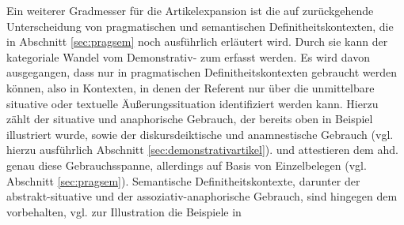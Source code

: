 Ein weiterer Gradmesser für die Artikelexpansion  ist die auf \textcite{Lobner1985,Lobner1998} zurückgehende Unterscheidung   von pragmatischen  und semantischen   Definitheitskontexten,  die in Abschnitt \ref{sec:pragsem} noch ausführlich erläutert wird. Durch sie kann der kategoriale Wandel vom Demonstrativ-  zum  erfasst werden. Es wird davon ausgegangen, dass  nur in pragmatischen Definitheitskontexten  gebraucht werden können, also in Kontexten, in denen der Referent nur über die unmittelbare situative oder textuelle Äußerungssituation identifiziert werden kann. Hierzu zählt der situative  und anaphorische  Gebrauch, der bereits oben in Beispiel  illustriert wurde, sowie der diskursdeiktische  und anamnestische  Gebrauch (vgl. hierzu ausführlich Abschnitt \ref{sec:demonstrativartikel}). \textcite[84--88]{Philippi1997} und \textcite[112--117]{Demske2001} attestieren dem ahd.  genau diese Gebrauchsspanne, allerdings auf Basis von Einzelbelegen (vgl. Abschnitt \ref{sec:pragsem}). Semantische Definitheitskontexte,  darunter der abstrakt-situative  und der assoziativ-anaphorische  Gebrauch, sind hingegen dem  vorbehalten, vgl. zur Illustration die Beispiele   in 

